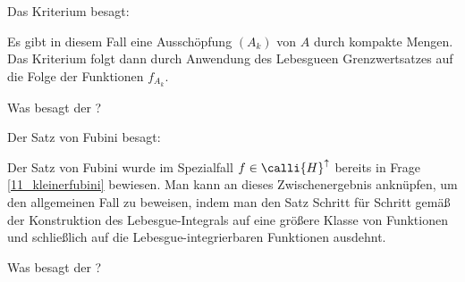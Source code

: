 \begin{antwort}
  Das Kriterium besagt: 

  \medskip\noindent
  Es gibt in diesem Fall eine Ausschöpfung $(A_k)$ von $A$ durch kompakte 
  Mengen. Das Kriterium folgt dann durch Anwendung des Lebesgue\sch en 
  Grenzwertsatzes auf die Folge der Funktionen $f_{A_k}$. \AntEnd
\end{antwort}  

\begin{frage}
  Was besagt der ?
\end{frage}

\begin{antwort}
  Der Satz von Fubini besagt:

  \medskip
  \noindent{}%
  \noindent
  Der Satz von Fubini wurde im Spezialfall $f\in\calli{H}^\uparrow$ bereits 
  in Frage \ref{11_kleinerfubini} 
  bewiesen. Man kann an dieses Zwischenergebnis anknüpfen, 
  um den allgemeinen Fall zu beweisen, indem man den Satz Schritt für 
  Schritt gemäß der Konstruktion des Lebesgue-Integrals auf eine größere 
  Klasse von Funktionen und schließlich auf die Lebesgue-integrierbaren 
  Funktionen ausdehnt. \AntEnd
\end{antwort}

\begin{frage}
  Was besagt der ?
\end{frage}

